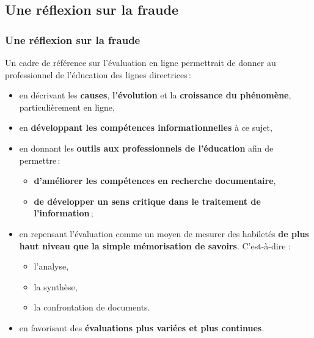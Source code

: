 \documentclass{beamer}
\begin{document}
			\subsection{Une réflexion sur la fraude} 
				\begin{frame}[allowframebreaks]
			 		\frametitle{Une réflexion sur la fraude \citep{Dubreucq2011}}
			 		Un cadre de référence sur l'évaluation en ligne permettrait de donner au professionnel de l'éducation des lignes directrices\,: 
					\begin {itemize}
						\item en décrivant les \textbf{causes}, \textbf{l'évolution} et la \textbf{croissance du phénomène}, particulièrement en ligne,
						\item en \textbf{développant les compétences informationnelles} à ce sujet,
						\item en donnant les \textbf{outils aux professionnels de l'éducation} afin de permettre\citep{bergadaa2008relation}\,:
							\begin {itemize}
								\item \textbf{d'améliorer les compétences en recherche documentaire},
								\item \textbf{de développer un sens critique dans le traitement de l'information}\,;
							\end{itemize}
						\item en repensant l'évaluation comme un moyen de mesurer des habiletés \textbf{de plus haut niveau que la simple mémorisation de savoirs}. C'est-à-dire :
							\begin {itemize}
								\item l'analyse,
								\item la synthèse, 
								\item la confrontation de documents.
							\end{itemize}
						\item en favorisant des \textbf{évaluations plus variées et plus continues}.
								
					\end{itemize}
				\end{frame}
			
\end{document}
